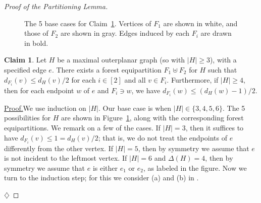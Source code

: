 \documentclass[11pt]{article}
\theoremstyle{definition}
\newtheorem{clm}{Claim}
\renewcommand\ge\geqslant
\renewcommand\le\leqslant
\newenvironment{clmproof}[1]{\par\noindent\underline{Proof.}\space#1}{\leavevmode\unskip\penalty9999\hbox{}\nobreak\hfill\quad\hbox{$\diamondsuit$}\smallskip}
\def\mgray{gray!65!white}
\def\drawthick{\draw[line width=.8mm]}
\begin{document}
\begin{proof}[Proof of the Partitioning Lemma]
\begin{figure}[!h]
\begin{tikzpicture}[yscale=1.732,scale=.9]
        \end{tikzpicture}
        \captionsetup{width=.675\textwidth}
        \caption{The 5 base cases for Claim~\ref{clm3}. Vertices of $F_1$ are shown in white, and those of $F_2$ are shown in gray.  Edges induced by each $F_i$ are drawn in bold.}
        \label{base-case-fig}
    \end{figure}
\begin{clm}
	Let $H$ be a maximal outerplanar graph (so with $|H|\ge 3$), with a specified edge $e$.
	There exists a forest equipartition $F_1\uplus F_2$ for $H$ such that 
	$d_{F_i}(v)\le d_H(v)/2$ for each $i\in[2]$ and all $v\in F_i$.  Furthermore, if $|H|\ge 4$, then for each endpoint $w$ of $e$ and 
	$F_i\ni w$, we have $d_{F_i}(w)\le (d_H(w)-1)/2$.
	\label{clm3}
\end{clm}
\begin{clmproof}
	We use induction on $|H|$.  
	Our base case is when $|H|\in\{3,4,5,6\}$.  
	The 5 possibilities for $H$ are shown in Figure~\ref{base-case-fig}, along with the corresponding forest equipartitions.
%
	We remark on a few of the cases.
	If $|H|=3$, then it suffices to have $d_{F_i}(v)\le 1 = d_H(v)/2$; that is, we do not treat the endpoints of $e$ differently from the other vertex.
	If $|H|=5$, then by symmetry we assume that $e$ is not incident to the leftmost vertex.
	If $|H|=6$ and $\Delta(H)=4$, then by symmetry we assume that $e$ is either $e_1$ or $e_2$, as labeled in the figure.
	Now we turn to the induction step; for this we consider (a) and (b) in .


    \begin{figure}[!t]
        \centering
\end{figure}
\end{clmproof}
\end{proof}
\end{document}
